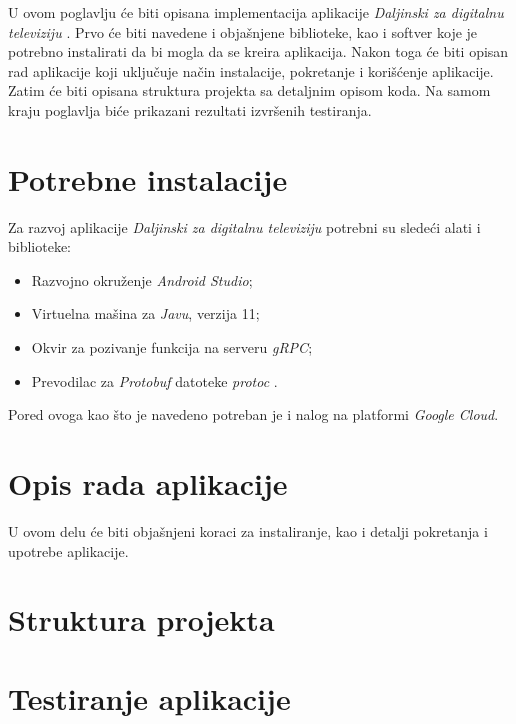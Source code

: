 \documentclass[../TamaraIvanovicMasterRad.tex]{subfiles}
\begin{document}
U ovom poglavlju će biti opisana implementacija aplikacije \textit{Daljinski za digitalnu televiziju} \cite{sajt:remoteApp}. Prvo će biti navedene i objašnjene biblioteke, kao i softver koje je potrebno instalirati da bi mogla da se kreira aplikacija. Nakon toga će biti opisan rad aplikacije koji uključuje način instalacije, pokretanje i korišćenje aplikacije. Zatim će biti opisana struktura projekta sa detaljnim opisom koda. Na samom kraju poglavlja biće prikazani rezultati izvršenih testiranja.

\section{Potrebne instalacije} 
Za razvoj aplikacije \textit{Daljinski za digitalnu televiziju} potrebni su sledeći alati i biblioteke:
\begin{itemize}
    \item Razvojno okruženje \textit{Android Studio};
    \item Virtuelna mašina za \textit{Javu}, verzija 11;
    \item Okvir za pozivanje funkcija na serveru \textit{gRPC};
    \item Prevodilac za \textit{Protobuf} datoteke \textit{protoc} \cite{sajt:protoc}.
\end{itemize}
Pored ovoga kao što je navedeno potreban je i nalog na platformi \textit{Google Cloud}.
\section{Opis rada aplikacije} \label{opis_rada}
U ovom delu će biti objašnjeni koraci za instaliranje, kao i detalji pokretanja i upotrebe aplikacije. 





\section{Struktura projekta}



\section{Testiranje aplikacije}

\end{document}
